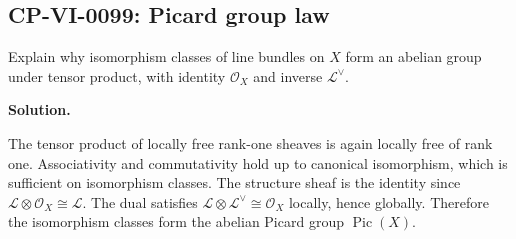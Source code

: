 
\subsection*{CP-VI-0099: Picard group law}

Explain why isomorphism classes of line bundles on $X$ form an abelian group under tensor product, with identity $\mathcal O_X$ and inverse $\mathcal L^\vee$.

\medskip
\noindent\textbf{Solution.}

The tensor product of locally free rank-one sheaves is again locally free of rank one. Associativity and commutativity hold up to canonical isomorphism, which is sufficient on isomorphism classes. The structure sheaf is the identity since $\mathcal L\otimes\mathcal O_X\cong\mathcal L$. The dual satisfies $\mathcal L\otimes\mathcal L^\vee\cong\mathcal O_X$ locally, hence globally. Therefore the isomorphism classes form the abelian Picard group $\operatorname{Pic}(X)$.
